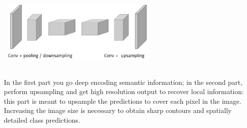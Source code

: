\begin{minipage}{\linewidth}
        \centering
        \includegraphics[width=8.1cm, height=3cm]{images/segm_architecture.png}
\end{minipage} \\

In the first part you go deep encoding semantic information; in the second part, perform upsampling and get high resolution output to recover local information: this part is meant to upsample the predictions to cover each pixel in the image. Increasing the image size is necessary to obtain sharp contours and spatially detailed class predictions. 


